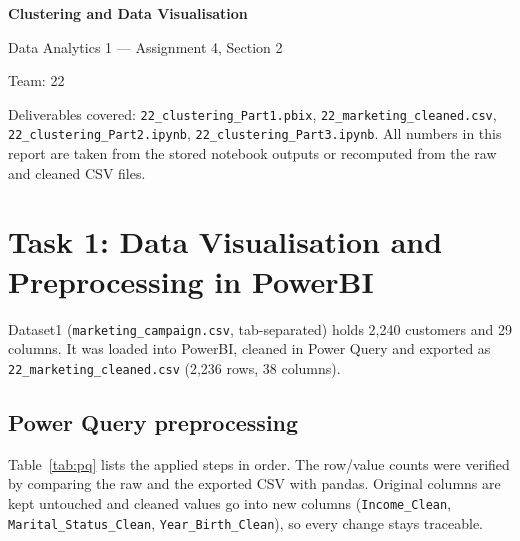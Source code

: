 \documentclass[11pt]{article}
\begin{document}
\begin{titlepage}
\centering\vspace*{4cm}
{\LARGE\bfseries Clustering and Data Visualisation\par}\vspace{0.6cm}
{\large Data Analytics 1 --- Assignment 4, Section 2\par}\vspace{0.4cm}
{\large Team: 22\par}\vspace{1.5cm}
\begin{minipage}{0.8\textwidth}\small\raggedright
Deliverables covered: \texttt{22\_clustering\_Part1.pbix}, \texttt{22\_marketing\_cleaned.csv},
\texttt{22\_clustering\_Part2.ipynb}, \texttt{22\_clustering\_Part3.ipynb}.
All numbers in this report are taken from the stored notebook outputs or recomputed from the
raw and cleaned CSV files.
\end{minipage}
\end{titlepage}
\tableofcontents
\newpage

\section{Task 1: Data Visualisation and Preprocessing in PowerBI}
Dataset1 (\texttt{marketing\_campaign.csv}, tab-separated) holds 2{,}240 customers and 29 columns.
It was loaded into PowerBI, cleaned in Power Query and exported as
\texttt{22\_marketing\_cleaned.csv} (2{,}236 rows, 38 columns).

\subsection{Power Query preprocessing}
Table~\ref{tab:pq} lists the applied steps in order. The row/value counts were verified by
comparing the raw and the exported CSV with pandas.
Original columns are kept untouched and cleaned values go into new columns
(\texttt{Income\_Clean}, \texttt{Marital\_Status\_Clean}, \texttt{Year\_Birth\_Clean}), so every
change stays traceable.
\end{document}
